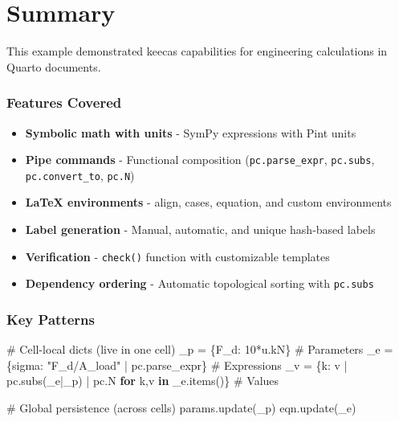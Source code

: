 \documentclass[
  letterpaper,
  DIV=11,
  numbers=noendperiod,
  fleqn]{scrartcl}
\newenvironment{Shaded}{\begin{snugshade}}{\end{snugshade}}
\newcommand{\CommentTok}[1]{\textcolor[rgb]{0.37,0.37,0.37}{#1}}
\newcommand{\ControlFlowTok}[1]{\textcolor[rgb]{0.00,0.23,0.31}{\textbf{#1}}}
\newcommand{\DecValTok}[1]{\textcolor[rgb]{0.68,0.00,0.00}{#1}}
\newcommand{\KeywordTok}[1]{\textcolor[rgb]{0.00,0.23,0.31}{\textbf{#1}}}
\newcommand{\NormalTok}[1]{\textcolor[rgb]{0.00,0.23,0.31}{#1}}
\newcommand{\OperatorTok}[1]{\textcolor[rgb]{0.37,0.37,0.37}{#1}}
\newcommand{\StringTok}[1]{\textcolor[rgb]{0.13,0.47,0.30}{#1}}
\providecommand{\tightlist}{%
  \setlength{\itemsep}{0pt}\setlength{\parskip}{0pt}}
\begin{document}
\newpage{}

\section{Summary}\label{summary}

This example demonstrated keecas capabilities for engineering
calculations in Quarto documents.

\subsubsection{Features Covered}\label{features-covered}

\begin{itemize}
\tightlist
\item
  \textbf{Symbolic math with units} - SymPy expressions with Pint units
\item
  \textbf{Pipe commands} - Functional composition
  (\texttt{pc.parse\_expr}, \texttt{pc.subs}, \texttt{pc.convert\_to},
  \texttt{pc.N})
\item
  \textbf{LaTeX environments} - align, cases, equation, and custom
  environments
\item
  \textbf{Label generation} - Manual, automatic, and unique hash-based
  labels
\item
  \textbf{Verification} - \texttt{check()} function with customizable
  templates
\item
  \textbf{Dependency ordering} - Automatic topological sorting with
  \texttt{pc.subs}
\end{itemize}

\subsubsection{Key Patterns}\label{key-patterns}

\begin{Shaded}
\begin{Highlighting}[]
\CommentTok{\# Cell{-}local dicts (live in one cell)}
\NormalTok{\_p }\OperatorTok{=}\NormalTok{ \{F\_d: }\DecValTok{10}\OperatorTok{*}\NormalTok{u.kN\}                              }\CommentTok{\# Parameters}
\NormalTok{\_e }\OperatorTok{=}\NormalTok{ \{sigma: }\StringTok{"F\_d/A\_load"} \OperatorTok{|}\NormalTok{ pc.parse\_expr\}       }\CommentTok{\# Expressions}
\NormalTok{\_v }\OperatorTok{=}\NormalTok{ \{k: v }\OperatorTok{|}\NormalTok{ pc.subs(\_e}\OperatorTok{|}\NormalTok{\_p) }\OperatorTok{|}\NormalTok{ pc.N }\ControlFlowTok{for}\NormalTok{ k,v }\KeywordTok{in}\NormalTok{ \_e.items()\}  }\CommentTok{\# Values}

\CommentTok{\# Global persistence (across cells)}
\NormalTok{params.update(\_p)}
\NormalTok{eqn.update(\_e)}
\end{Highlighting}
\end{Shaded}
\end{document}
